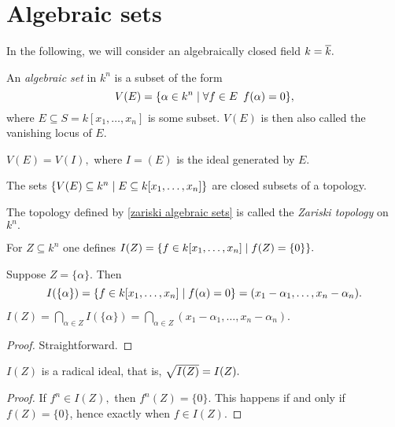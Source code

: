 \section{Algebraic sets}
In the following, we will consider an algebraically closed field \(k = \overline{k}.\)
\begin{df}
  An \emph{algebraic set} in \(k^n\) is a subset of the form
  \[V(E) = \{\alpha \in k^n \mathrel{|} \forall f \in E \enspace f(\alpha) = 0\},\]
  where \(E \subseteq S = k[x_1, \dotsc, x_n]\) is some subset. \(V(E)\) is then also called the vanishing locus of \(E.\)
\end{df}

\begin{note}
  \(V(E) = V(I),\) where \(I = (E)\) is the ideal generated by \(E.\)
\end{note}

\begin{lemma}
  \label{zariski algebraic sets}
  The sets
  \(\{V(E) \subseteq k^n \mathrel{|} E \subseteq k[x_1, \dotsc, x_n]\}\)
  are closed subsets of a topology.
\end{lemma}


\begin{df}
  The topology defined by \cref{zariski algebraic sets} is called the \emph{Zariski topology} on \(k^n.\)
\end{df}

\begin{df}
  For \(Z \subseteq k^n\) one defines
  \(I(Z) = \{f \in k[x_1, \dotsc, x_n] \mathrel{|} f(Z) = \{0\}\}.\)
\end{df}

\begin{example}
  Suppose \(Z = \{\alpha\}.\) Then \[I(\{\alpha\}) = \{f \in k[x_1, \dotsc, x_n] \mathrel{|} f(\alpha) = 0\} = (x_1 - \alpha_1, \dotsc, x_n - \alpha_n).\]
\end{example}

\begin{lemma}
  \(I(Z) = \bigcap_{\alpha \in Z} I(\{\alpha\}) = \bigcap_{\alpha \in Z} (x_1 - \alpha_1, \dotsc, x_n - \alpha_n).\)
\end{lemma}
\begin{proof}
  Straightforward.
\end{proof}

\begin{lemma}
  \(I(Z)\) is a radical ideal, that is, \(\sqrt{I(Z)} = I(Z).\)
\end{lemma}
\begin{proof}
  If \(f^n \in I(Z),\) then \(f^n(Z)  = \{0\}\). This happens if and only if \(f(Z) = \{0\}\), hence exactly when \(f \in I(Z).\)
\end{proof}


